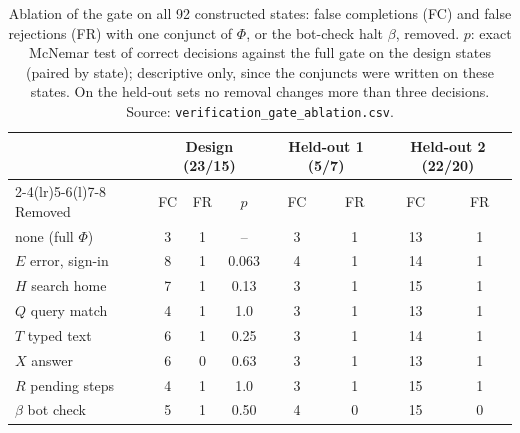 \begin{table}[t]
\centering
\caption{Ablation of the gate on all 92 constructed states: false completions (FC) and false rejections (FR) with one conjunct of $\Phi$, or the bot-check halt $\beta$, removed. $p$: exact McNemar test of correct decisions against the full gate on the design states (paired by state); descriptive only, since the conjuncts were written on these states. On the held-out sets no removal changes more than three decisions. Source: \texttt{verification\_gate\_ablation.csv}.}
\label{tab:ablation}
\footnotesize
\setlength{\tabcolsep}{3pt}
\begin{tabular}{@{}lccccccc@{}}
\toprule
 & \multicolumn{3}{c}{Design (23/15)} & \multicolumn{2}{c}{Held-out 1 (5/7)} & \multicolumn{2}{c}{Held-out 2 (22/20)} \\
\cmidrule(lr){2-4}\cmidrule(lr){5-6}\cmidrule(l){7-8}
Removed & FC & FR & $p$ & FC & FR & FC & FR \\
\midrule
none (full $\Phi$) & 3 & 1 & -- & 3 & 1 & 13 & 1 \\
$E$ error, sign-in & 8 & 1 & 0.063 & 4 & 1 & 14 & 1 \\
$H$ search home & 7 & 1 & 0.13 & 3 & 1 & 15 & 1 \\
$Q$ query match & 4 & 1 & 1.0 & 3 & 1 & 13 & 1 \\
$T$ typed text & 6 & 1 & 0.25 & 3 & 1 & 14 & 1 \\
$X$ answer & 6 & 0 & 0.63 & 3 & 1 & 13 & 1 \\
$R$ pending steps & 4 & 1 & 1.0 & 3 & 1 & 15 & 1 \\
$\beta$ bot check & 5 & 1 & 0.50 & 4 & 0 & 15 & 0 \\
\bottomrule
\end{tabular}
\end{table}

